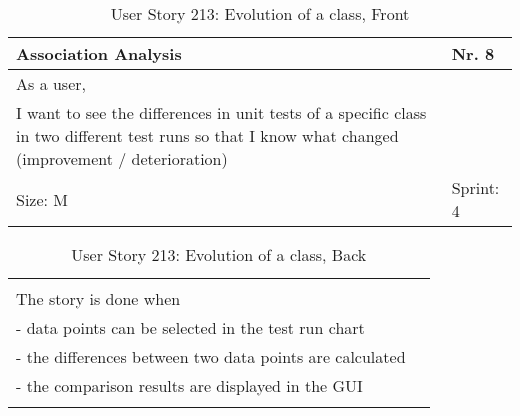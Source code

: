 \begin{table}[H]
  \caption{User Story 213: Evolution of a class, Front}
  \label{Story_213_Front}
  \centering
  \begin{tabular}{|p{9cm} p{2cm}|}
	\hline  	
  	Association Analysis & Nr. 8 \\ 
  	\hline
  	As a user, &    \\ 
  	I want to see the differences in unit tests of a specific class in two different test runs so that I know what changed (improvement / deterioration) &    \\ 
  	Size: M & Sprint: 4 \\ 
  	\hline
  \end{tabular}
\end{table}
\begin{table}[H]
  \caption{User Story 213: Evolution of a class, Back}
  \label{Story_213_Back}
  \centering
  \begin{tabular}{|p{10cm} p{1cm}|}
  \hline
  	  &    \\ 
  	The story is done when &    \\ 
  	 - data points can be selected in the test run chart & \\ 
  	 - the differences between two data points are calculated & \\ 
  	 - the comparison results are displayed in the GUI & \\  
  	 
  	  &  
  	   \\ 
  	\hline
  \end{tabular}
\end{table}

\ \\

